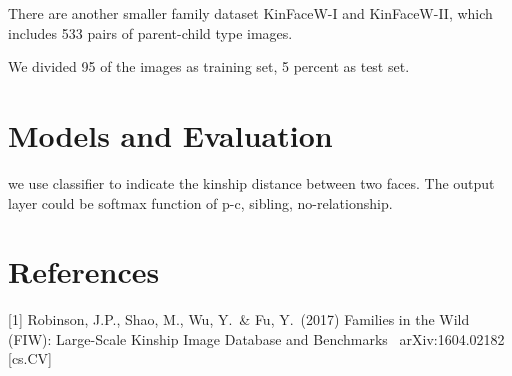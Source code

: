 \documentclass{article}
\begin{document}
There are another smaller family dataset KinFaceW-I and KinFaceW-II, which
includes 533 pairs of parent-child type images.

We divided 95 of the images as training set, 5 percent as test set.

\section{Models and Evaluation}
we use classifier to indicate the kinship distance between two faces. The output layer could be softmax function of {p-c, sibling, no-relationship}.



\section*{References}
\medskip
\small
[1] Robinson, J.P., Shao, M., Wu, Y.\ \& Fu, Y.\ (2017) Families in the Wild (FIW): Large-Scale Kinship Image Database and Benchmarks \ arXiv:1604.02182 [cs.CV]
\end{document}
